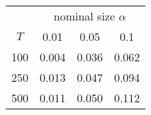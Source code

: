 % 
\begin{tabular}{cccc}
  \hline
  & \multicolumn{3}{c}{nominal size $\alpha$} \\
 $T$ & 0.01 & 0.05 & 0.1 \\
 \hline
100 & 0.004 & 0.036 & 0.062 \\ 
  250 & 0.013 & 0.047 & 0.094 \\ 
  500 & 0.011 & 0.050 & 0.112 \\ 
   \hline
\end{tabular}
